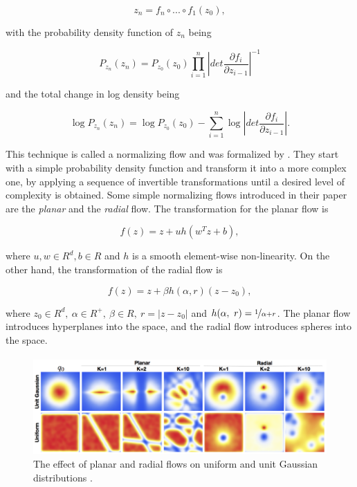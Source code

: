 \begin{displaymath}
    z_n = f_n \circ ... \circ f_1(z_0),
\end{displaymath}

with the probability density function of $ z_n $ being

\begin{equation}
    \label{equation:cnf:nf:total_change_density}
    P_{z_n}(z_n) = P_{z_0}(z_0) \prod_{i=1}^n \left | det \frac{\partial f_i}{\partial z_{i-1}} \right |^{-1}
\end{equation}

and the total change in log density being

\begin{equation}
    \label{equation:cnf:nf:total_change_log_density}
    \log P_{z_n}(z_n) = \log P_{z_0}(z_0) - \sum_{i=1}^n \log \left | det \frac{\partial f_i}{\partial z_{i-1}} \right |.
\end{equation}

This technique is called a normalizing flow and was formalized by \citet{rezende2015variational}. They start with a simple probability density function and transform it into a more complex one, by applying a sequence of invertible transformations until a desired level of complexity is obtained. Some simple normalizing flows introduced in their paper \citep{rezende2015variational} are the \emph{planar} and the \emph{radial} flow. The transformation for the planar flow is

\begin{displaymath}
    f(z) = z + uh(w^Tz + b),
\end{displaymath}

where $ u, w \in R^d, b \in R $ and $ h $ is a smooth element-wise non-linearity. On the other hand, the transformation of the radial flow is

\begin{displaymath}
    f(z) = z + \beta h(\alpha, r)(z - z_0),
\end{displaymath}

where $ z_0 \in R^d, \ \alpha \in R^+, \ \beta \in R, \ r = \lvert z - z_0 \rvert $ and $ h(\alpha, \ r) = \nicefrac{1}{\alpha + r} $. The planar flow introduces hyperplanes into the space, and the radial flow introduces spheres into the space.

\begin{figure}[ht]
      \centering
      \includegraphics[width=\columnwidth]{figures/planar_radial_flows.png}
      \caption{The effect of planar and radial flows on uniform and unit Gaussian distributions \citep{rezende2015variational}.}
      \label{figure:cnf:planar_radial_flows}
\end{figure}

